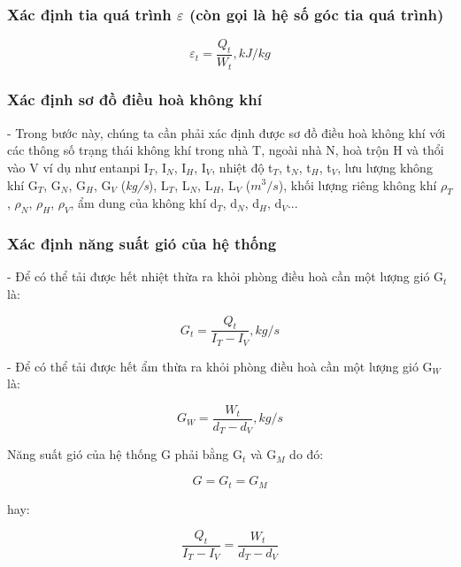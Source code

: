 \subsubsection{Xác định tia quá trình {\Large $\varepsilon$} (còn gọi là hệ số góc tia quá trình)}
\begin{equation}
	\varepsilon_{t} =  \dfrac{Q_{t}}{W_{t}}, \textit{kJ/kg}
\end{equation}

\subsubsection{Xác định sơ đồ điều hoà không khí}
- Trong bước này, chúng ta cần phải xác định được sơ đồ điều hoà không khí với các thông số trạng thái không khí trong nhà T, ngoài nhà N, hoà trộn H và thổi vào V ví dụ như entanpi I$_{T}$, I$_{N}$, I$_{H}$, I$_{V}$, nhiệt độ t$_{T}$, t$_{N}$, t$_{H}$, t$_{V}$, lưu lượng không khí G$_{T}$, G$_{N}$, G$_{H}$, G$_{V}$ (\textit{kg/s}), L$_{T}$, L$_{N}$, L$_{H}$, L$_{V}$ (\textit{$m^3/s$}), khối lượng riêng không khí $\rho_{T}$, $\rho_{N}$, $\rho_{H}$, $\rho_{V}$, ẩm dung của không khí d$_{T}$, d$_{N}$, d$_{H}$, d$_{V}$...

\subsubsection{Xác định năng suất gió của hệ thống}
- Để có thể tải được hết nhiệt thừa ra khỏi phòng điều hoà cần một lượng gió G$_{t}$ là:

\begin{equation}
	G_{t} = \dfrac{Q_{t}}{I_{T} - I_{V}} , \textit{kg/s}
\end{equation}

- Để có thể tải được hết ẩm thừa ra khỏi phòng điều hoà cần một lượng gió G$_{W}$ là:

\begin{equation}
	 G_{W} = \dfrac{W_{t}}{d_{T} - d_{V}} , \textit{kg/s}
\end{equation}

Năng suất gió của hệ thống G phải bằng G$_{t}$ và G$_{M}$ do đó:

\begin{equation}
	G = G_{t} = G_{M}
\end{equation}

hay:

\begin{equation}
	 \dfrac{Q_{t}}{I_{T} - I_{V}}  = \dfrac{W_{t}}{d_{T} - d_{V}} 
\end{equation}

